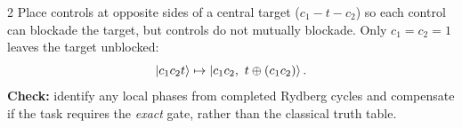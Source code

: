 \begin{multicols}{2}
Place controls at opposite sides of a central target ($c_1-t-c_2$) so each control can blockade the target, but controls do not mutually blockade. Only $c_1=c_2=1$ leaves the target unblocked:
\[\ket{c_1c_2t}\mapsto\ket{c_1c_2,\ t\oplus(c_1c_2)}.\]
\textbf{Check:} identify any local phases from completed Rydberg cycles and compensate if the task requires the \emph{exact} gate, rather than the classical truth table.
\end{multicols}